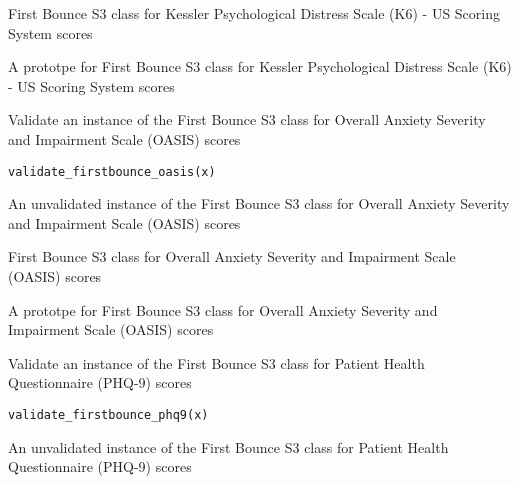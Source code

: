 \documentclass[a4paper]{book}
\begin{document}
%
\begin{Details}\relax
First Bounce S3 class for Kessler Psychological Distress Scale (K6) - US Scoring System scores
\end{Details}
%
\begin{Value}
A prototpe for First Bounce S3 class for Kessler Psychological Distress Scale (K6) - US Scoring System scores
\end{Value}
%
\begin{Description}\relax
Validate an instance of the First Bounce S3 class for Overall Anxiety Severity and Impairment Scale (OASIS) scores
\end{Description}
%
\begin{Usage}
\begin{verbatim}
validate_firstbounce_oasis(x)
\end{verbatim}
\end{Usage}
%
\begin{Arguments}
\begin{ldescription}
\item[\code{x}] An unvalidated instance of the First Bounce S3 class for Overall Anxiety Severity and Impairment Scale (OASIS) scores
\end{ldescription}
\end{Arguments}
%
\begin{Details}\relax
First Bounce S3 class for Overall Anxiety Severity and Impairment Scale (OASIS) scores
\end{Details}
%
\begin{Value}
A prototpe for First Bounce S3 class for Overall Anxiety Severity and Impairment Scale (OASIS) scores
\end{Value}
%
\begin{Description}\relax
Validate an instance of the First Bounce S3 class for Patient Health Questionnaire (PHQ-9) scores
\end{Description}
%
\begin{Usage}
\begin{verbatim}
validate_firstbounce_phq9(x)
\end{verbatim}
\end{Usage}
%
\begin{Arguments}
\begin{ldescription}
\item[\code{x}] An unvalidated instance of the First Bounce S3 class for Patient Health Questionnaire (PHQ-9) scores
\end{ldescription}
\end{Arguments}
\end{document}
